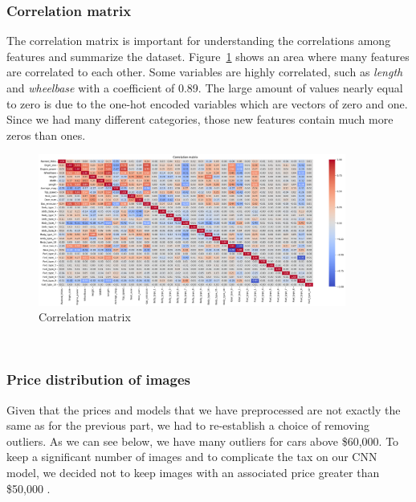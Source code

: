 \documentclass[12pt]{article}
\begin{document}
\FloatBarrier

\subsubsection{Correlation matrix}

\noindent The correlation matrix is important for understanding the correlations among features and summarize the dataset. Figure~\ref{Correlation matrix} shows an area where many features are correlated to each other. Some variables are highly correlated, such as \textit{length} and \textit{wheelbase} with a coefficient of 0.89. The large amount of values nearly equal to zero is due to the one-hot encoded variables which are vectors of zero and one. Since we had many different categories, those new features contain much more zeros than ones.

\FloatBarrier
\begin{figure}[ht]
    \centering
    \includegraphics[width=0.90\textwidth]{Correlation matrix.png}
    \caption{Correlation matrix}
    \label{Correlation matrix}
\end{figure}\\
\FloatBarrier

\subsubsection{Price distribution of images}
\noindent Given that the prices and models that we have preprocessed are not exactly the same as for the previous part, we had to re-establish a choice of removing outliers. As we can see below, we have many outliers for cars above \$60,000. To keep a significant number of images and to complicate the tax on our CNN model, we decided not to keep images with an associated price greater than \$50,000 .
\end{document}
